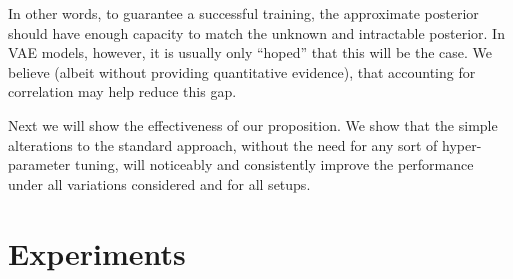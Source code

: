 \documentclass{article}
\begin{document}
In other words, to guarantee a successful training, the approximate posterior should have enough capacity to match the unknown and intractable posterior. In VAE models, however, it is usually only ``hoped'' that this will be the case. We believe (albeit without providing quantitative evidence), that accounting for correlation may help reduce this gap.

Next we will show the effectiveness of our proposition. We show that the simple alterations to the standard approach, without the need for any sort of hyper-parameter tuning, will noticeably and consistently improve the performance under all variations considered and for all setups. 

\section{Experiments} \label{sec:exp} 






\end{document}
